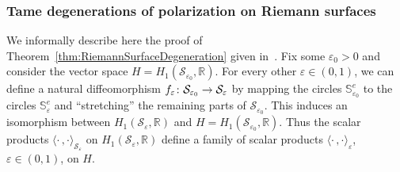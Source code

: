 \documentclass[AHL,Unicode,longabstracts]{cedram}
\newcommand{\innone}[2]{{\langle#2\rangle_{#1}}}
\newcommand{\R}{\mathbb{R}}
\renewcommand{\S}{\mathbb{S}}
\newcommand{\rsf}{\mathcal{S}}
\renewcommand*{\to}{\mathchoice{\longrightarrow}{\rightarrow}{\rightarrow}{\rightarrow}}
\begin{document}
\subsubsection{Tame degenerations of polarization on Riemann surfaces}

We informally describe here the proof of Theorem~\ref{thm:RiemannSurfaceDegeneration} given in~\cite{AN-AG-hybrid}. Fix some $\varepsilon_0 >0$ and consider the vector space $H = H_1(\rsf_{\varepsilon_0}, \R)$. For every other $\varepsilon \in (0,1)$, we can define a natural diffeomorphism $f_\varepsilon \colon \rsf_{\varepsilon_0} \to \rsf_\varepsilon$ by mapping the circles $\S^e_{\varepsilon_0}$ to the circles $\S^e_{\varepsilon}$ and ``stretching'' the remaining parts of $\rsf_{\varepsilon_0}$. This induces an isomorphism between $H_1(\rsf_\varepsilon, \R)$ and $H = H_1(\rsf_{\varepsilon_0}, \R)$. Thus the scalar products $\innone{\rsf_\varepsilon}{\cdot \,, \cdot}$ on $H_1(\rsf_\varepsilon, \R)$ define a family of scalar products $\innone{\varepsilon}{\cdot \,, \cdot}$, $\varepsilon \in (0,1)$, on $H$.
\end{document}

